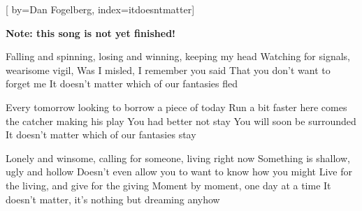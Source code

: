 

[%
    by={Dan Fogelberg},
    index={itdoesntmatter}]


    \label{itdoesntmatter}

    \textbf{Note: this song is not yet finished!}

    \beginverse
        Falling and spinning, losing and winning, keeping my head
        Watching for signals, wearisome vigil,
        Was I misled, I remember you said
        That you don't want to forget me
        It doesn't matter which of our fantasies fled
    \endverse

    \beginverse
        Every tomorrow looking to borrow a piece of today
        Run a bit faster here comes the catcher making his play
        You had better not stay
        You will soon be surrounded
        It doesn't matter which of our fantasies stay
    \endverse

    \beginverse
        Lonely and winsome, calling for someone, living right now
        Something is shallow, ugly and hollow
        Doesn't even allow you to want to know how you might
        Live for the living, and give for the giving
        Moment by moment, one day at a time
        It doesn't matter, it's nothing but dreaming anyhow
    \endverse
\endsong

